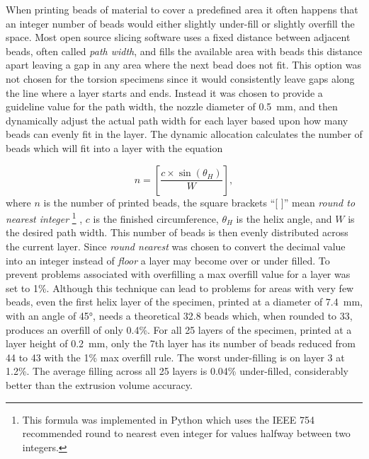 \documentclass[main.tex]{subfiles}
\begin{document}
When printing beads of material to cover a predefined area it often happens that an integer number of beads would either slightly under-fill or slightly overfill the space.
Most open source slicing software uses a fixed distance between adjacent beads, often called \emph{path width}, and fills the available area with beads this distance apart leaving a gap in any area where the next bead does not fit.
This option was not chosen for the torsion specimens since it would consistently leave gaps along the line where a layer starts and ends.
Instead it was chosen to provide a guideline value for the path width, the nozzle diameter of \SI{0.5}{mm}, and then dynamically adjust the actual path width for each layer based upon how many beads can evenly fit in the layer.
The dynamic allocation calculates the number of beads which will fit into a layer with the equation

\begin{equation}
n = \left[ \frac{c \times \sin(\theta_H)}{W} \right],
\end{equation}
where $n$ is the number of printed beads, the square brackets ``[ ]'' mean \emph{round to nearest integer}%
\footnote{This formula was implemented in Python which uses the IEEE 754 recommended round to nearest even integer for values halfway between two integers.}%
, $c$ is the finished circumference, $\theta_H$ is the helix angle, and $W$ is the desired path width.
%
%
%
%
This number of beads is then evenly distributed across the current layer.
Since \emph{round nearest} was chosen to convert the decimal value into an integer instead of \emph{floor} a layer may become over or under filled.
To prevent problems associated with overfilling a max overfill value for a layer was set to 1\%.
Although this technique can lead to problems for areas with very few beads, even the first helix layer of the specimen, printed at a diameter of \SI{7.4}{mm}, with an angle of \ang{45}, needs a theoretical 32.8 beads which, when rounded to 33, produces an overfill of only 0.4\%.
For all 25 layers of the specimen, printed at a layer height of \SI{0.2}{mm}, only the 7th layer has its number of beads reduced from 44 to 43 with the 1\% max overfill rule.
The worst under-filling is on layer 3 at 1.2\%.
The average filling across all 25 layers is 0.04\% under-filled, considerably better than the extrusion volume accuracy.
\end{document}
